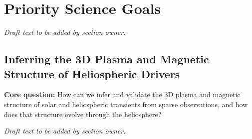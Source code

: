 \documentclass[
  draft
]{agujournal2025}
\begin{document}
\section{Priority Science Goals}

\noindent\textit{Draft text to be added by section owner.}

\subsection{Inferring the 3D Plasma and Magnetic Structure of Heliospheric Drivers}
\noindent\textbf{Core question:} How can we infer and validate the 3D plasma and magnetic structure of solar and heliospheric transients from sparse observations, and how does that structure evolve through the heliosphere?


\noindent\textit{Draft text to be added by section owner.}

\end{document}
